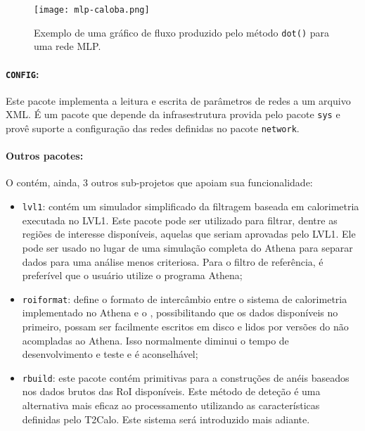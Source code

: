 \begin{figure}
\begin{center}
\texttt{[image: mlp-caloba.png]}
\end{center}
\caption{Exemplo de uma gráfico de fluxo produzido pelo método \texttt{dot()}
para uma rede MLP.}
\label{fig:mlp-dot-example}
\end{figure}

\paragraph{\texttt{CONFIG}:} Este pacote implementa a leitura e escrita de
parâmetros de redes a um arquivo XML. É um pacote que depende da
infrasestrutura provida pelo pacote \texttt{sys} e provê suporte a
configuração das redes definidas no pacote \texttt{network}.

\paragraph{Outros pacotes:} O  contém, ainda, 3 outros
sub-projetos que apoiam sua funcionalidade:

\begin{itemize}
\item \texttt{lvl1}: contém um simulador simplificado da filtragem baseada em
calorimetria executada no LVL1. Este pacote pode ser utilizado para filtrar,
dentre as regiões de interesse disponíveis, aquelas que seriam aprovadas pelo
LVL1. Ele pode ser usado no lugar de uma simulação completa do Athena para
separar dados para uma análise menos criteriosa. Para o filtro de referência,
é preferível que o usuário utilize o programa Athena;

\item \texttt{roiformat}: define o formato de intercâmbio entre o sistema de
calorimetria implementado no Athena e o , possibilitando que
os dados disponíveis no primeiro, possam ser facilmente escritos em disco e
lidos por versões do  não acompladas ao Athena. Isso
normalmente diminui o tempo de desenvolvimento e teste e é aconselhável;

\item \texttt{rbuild}: este pacote contém primitivas para a construções de
anéis baseados nos dados brutos das RoI disponíveis. Este método de deteção é
uma alternativa mais eficaz ao processamento utilizando as características
definidas pelo T2Calo. Este sistema será introduzido mais adiante.
\end{itemize}

